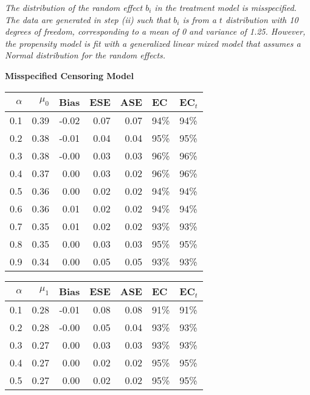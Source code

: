 \documentclass[12pt, letterpaper]{article}
\begin{document}
\begin{table}[ht!]
{\textit{The distribution of the random effect $b_i$ in the treatment model is misspecified. The data are generated in step (ii) such that $b_i$ is from a $t$ distribution with 10 degrees of freedom, corresponding to a mean of 0 and variance of 1.25. However, the propensity model is fit with a generalized linear mixed model that assumes a Normal distribution for the random effects.}}
\end{table}

\clearpage 


\begin{center}
\textbf{Misspecified Censoring Model} 
\end{center}
\begin{table}[ht!]
\centering
\bgroup
\def\arraystretch{1.25}
\setlength\tabcolsep{0.05in}
\begin{tabular}{rrrrrll}
  \hline
$\alpha$ & $\mu_0$ & Bias & ESE & ASE & EC & EC$_t$ \\ 
  \hline
0.1 & 0.39 & -0.02 & 0.07 & 0.07 & 94\% & 94\% \\ 
  0.2 & 0.38 & -0.01 & 0.04 & 0.04 & 95\% & 95\% \\ 
  0.3 & 0.38 & -0.00 & 0.03 & 0.03 & 96\% & 96\% \\ 
  0.4 & 0.37 & 0.00 & 0.03 & 0.02 & 96\% & 96\% \\ 
  0.5 & 0.36 & 0.00 & 0.02 & 0.02 & 94\% & 94\% \\ 
  0.6 & 0.36 & 0.01 & 0.02 & 0.02 & 94\% & 94\% \\ 
  0.7 & 0.35 & 0.01 & 0.02 & 0.02 & 93\% & 93\% \\ 
  0.8 & 0.35 & 0.00 & 0.03 & 0.03 & 95\% & 95\% \\ 
  0.9 & 0.34 & 0.00 & 0.05 & 0.05 & 93\% & 93\% \\    \hline
\end{tabular}
\egroup
\quad 
\bgroup
\setlength\tabcolsep{0.05in}
\def\arraystretch{1.25}
\begin{tabular}{rrrrrll}
  \hline
$\alpha$ & $\mu_1$ & Bias & ESE & ASE & EC & EC$_t$ \\ 
  \hline
0.1 & 0.28 & -0.01 & 0.08 & 0.08 & 91\% & 91\% \\ 
  0.2 & 0.28 & -0.00 & 0.05 & 0.04 & 93\% & 93\% \\ 
  0.3 & 0.27 & 0.00 & 0.03 & 0.03 & 93\% & 93\% \\ 
  0.4 & 0.27 & 0.00 & 0.02 & 0.02 & 95\% & 95\% \\ 
  0.5 & 0.27 & 0.00 & 0.02 & 0.02 & 95\% & 95\% \\ 

\end{tabular}
\end{table}
\end{document}
